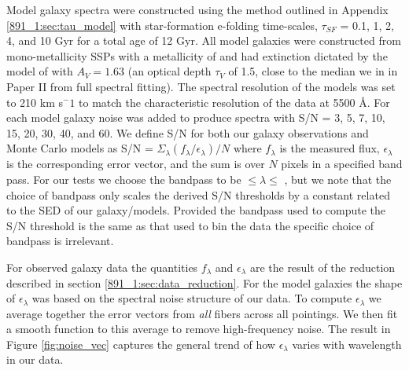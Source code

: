 Model galaxy spectra were constructed using the method outlined in
Appendix \ref{891_1:sec:tau_model} with star-formation e-folding
time-scales, $\tau_{SF}$ = 0.1, 1, 2, 4, and 10 Gyr for a total age of
12 Gyr.  All model galaxies were constructed from mono-metallicity
SSPs with a metallicity of  and had extinction
dictated by the model of \citet{Charlot00} with $A_V=1.63$ (an optical
depth $\tau_V$ of 1.5, close to the median we in in Paper II from full
spectral fitting). The spectral resolution of the models was set to
210 km s${^-1}$ to match the characteristic resolution of the data at
5500 \AA. For each model galaxy noise was added to produce spectra
with S/N = 3, 5, 7, 10, 15, 20, 30, 40, and 60. We define S/N for both
our galaxy observations and Monte Carlo models as S/N =
$\Sigma_{\lambda}\left(f_\lambda/\epsilon_\lambda\right)/N$ where
$f_\lambda$ is the measured flux, $\epsilon_\lambda$ is the
corresponding error vector, and the sum is over $N$ pixels in a
specified band pass. For our tests we choose the bandpass to be
 $\leq \lambda \leq$ , but we note that
the choice of bandpass only scales the derived S/N thresholds by a
constant related to the SED of our galaxy/models. Provided the
bandpass used to compute the S/N threshold is the same as that used to
bin the data the specific choice of bandpass is irrelevant.

For observed galaxy data the quantities $f_\lambda$ and
$\epsilon_\lambda$ are the result of the reduction described in
section \ref{891_1:sec:data_reduction}. For the model galaxies the shape of
$\epsilon_\lambda$ was based on the spectral noise structure of our
data.  To compute $\epsilon_\lambda$ we average together the error
vectors from \emph{all} fibers across all pointings. We then fit a
smooth function to this average to remove high-frequency noise. The
result in Figure \ref{fig:noise_vec} captures the general trend of how
$\epsilon_\lambda$ varies with wavelength in our data.




